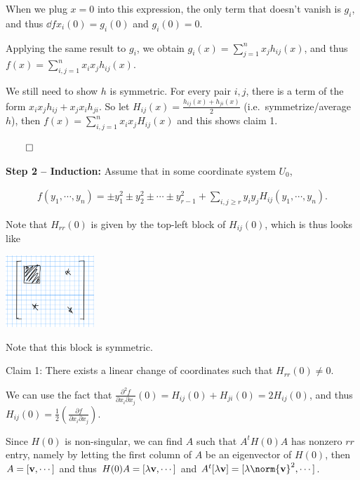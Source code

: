 When we plug \(x = 0\) into this expression, the only term that doesn't
vanish is \(g_i\), and thus \(\dd{f}{x_i}(0) = g_i(0)\) and
\(g_i(0) = 0\).

Applying the same result to \(g_i\), we obtain
\(g_i(x) = \sum_{j=1}^n x_j h_{ij}(x)\), and thus
\(f(x) = \sum_{i, j =1}^n x_i x_j h_{ij}(x)\).

We still need to show \(h\) is symmetric. For every pair \(i, j\), there
is a term of the form \(x_i x_j h_{ij} + x_j x_i h_{ji}\). So let
\(H_{ij}(x) = \frac{h_{ij}(x) + h_{ji}(x)}{2}\) (i.e.~symmetrize/average
\(h\)), then \(f(x) = \sum_{i, j = 1}^n x_i x_j H_{ij}(x)\) and this
shows claim 1.

\(\qed\)

\textbf{Step 2 -- Induction:} Assume that in some coordinate system
\(U_0\),

\begin{align*}
f(y_1, \cdots, y_n) = \pm y_1^2 \pm y_2^2 \pm \cdots \pm y_{r-1}^2 + \sum_{i, j \geq r} y_i y_j H_{ij}(y_1, \cdots, y_n)
.\end{align*}

Note that \(H_{rr}(0)\) is given by the top-left block of \(H_{ij}(0)\),
which is thus looks like

\begin{center}
   \includegraphics[width=0.25\textwidth,keepaspectratio]{sections/figures/2020-01-09-11:41.png}\\ 
\end{center}


Note that this block is symmetric.

Claim 1: There exists a linear change of coordinates such that
\(H_{rr}(0) \neq 0\).

We can use the fact that
\(\frac{\partial^2 f}{\partial x_i \partial x_j} (0) = H_{ij}(0) + H_{ji}(0) = 2 H_{ij}(0)\),
and thus
\(H_{ij}(0) = \frac{1}{2} \left( \frac{\partial f}{\partial x_i \partial x_j} \right)\).

Since \(H(0)\) is non-singular, we can find \(A\) such that
\(A^t H(0) A\) has nonzero \(rr\) entry, namely by letting the first
column of \(A\) be an eigenvector of \(H(0)\), then
\(A = [\mathbf{v}, \cdots]\) and thus
\(H(0)A = [\lambda \mathbf{v}, \cdots]\) and
\(A^t[\lambda \vector v] = [\lambda \norm{\vector v}^2, \cdots ]\).

